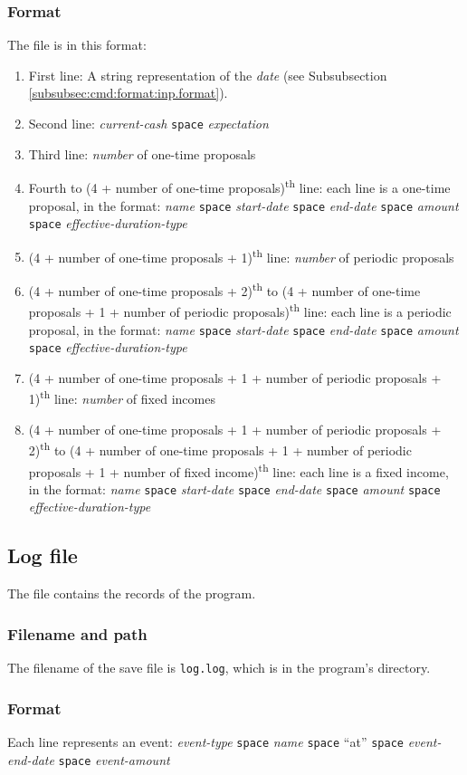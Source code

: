 \subsubsection{Format}
The file is in this format:
\begin{enumerate}
	\item First line: A string representation of the \emph{date} (see Subsubsection \ref{subsubsec:cmd:format:inp.format}).
	\item Second line: \emph{current-cash} \texttt{space} \emph{expectation}
	\item Third line: \emph{number} of one-time proposals
	\item Fourth to (4 + number of one-time proposals)\textsuperscript{th} line: each line is a one-time proposal, in the format: \emph{name} \texttt{space} \emph{start-date} \texttt{space} \emph{end-date} \texttt{space} \emph{amount} \texttt{space} \emph{effective-duration-type} 
	\item (4 + number of one-time proposals + 1)\textsuperscript{th} line: \emph{number} of periodic proposals
	\item (4 + number of one-time proposals + 2)\textsuperscript{th} to (4 + number of one-time proposals + 1 + number of periodic proposals)\textsuperscript{th} line: each line is a periodic proposal, in the format: \emph{name} \texttt{space} \emph{start-date} \texttt{space} \emph{end-date} \texttt{space} \emph{amount} \texttt{space} \emph{effective-duration-type} 
	\item (4 + number of one-time proposals + 1 + number of periodic proposals + 1)\textsuperscript{th} line: \emph{number} of fixed incomes
	\item (4 + number of one-time proposals + 1 + number of periodic proposals + 2)\textsuperscript{th} to (4 + number of one-time proposals + 1 + number of periodic proposals + 1 + number of fixed income)\textsuperscript{th} line: each line is a fixed income, in the format: \emph{name} \texttt{space} \emph{start-date} \texttt{space} \emph{end-date} \texttt{space} \emph{amount} \texttt{space} \emph{effective-duration-type} 
\end{enumerate}

\subsection{Log file}
The file contains the records of the program.

\subsubsection{Filename and path}
The filename of the save file is \texttt{log.log}, which is in the program's directory.

\subsubsection{Format}
Each line represents an event: \emph{event-type} \texttt{space} \emph{name} \texttt{space} ``at'' \texttt{space} \emph{event-end-date} \texttt{space} \emph{event-amount} 